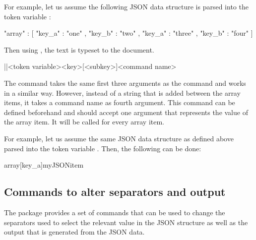 \documentclass[a4paper]{article}
\begin{document}
For example, let us assume the following JSON data structure is parsed into the token variable \macro{\myJSONdata}:

\begin{codeexample}
{
  "array" : [
    {
      "key_a" : "one" ,
      "key_b" : "two"
    } ,
    {
      "key_a" : "three" ,
      "key_b" : "four"
    }
  ]
}
\end{codeexample}

Then using , the text  is typeset to the document. 

\begin{macrodef}
|\JSONParseUseArrayValues|{<token variable>}{<key>}[<subkey>]{<command name>}
\end{macrodef}
The command \macro{\JSONParseUseArrayValues} takes the same first three arguments as the command \macro{\JSONParseGetArrayValues} and works in a similar way. However, instead of a string that is added between the array items, it takes a command name as fourth argument. This command can be defined beforehand and should accept one argument that represents the value of the array item. It will be called for every array item.

For example, let us assume the same JSON data structure as defined above parsed into the token variable \macro{\myJSONdata}. Then, the following can be done:


\begin{codeexamplecolumns}
\newcommand{\myJSONitem}[1]{
  \item \emph{#1}
}

\begin{itemize}
  \JSONParseUseArrayValues{\myJSONdata}
    {array}[key_a]{myJSONitem}
\end{itemize}
\end{codeexamplecolumns}

\subsection{Commands to alter separators and output}

The package provides a set of commands that can be used to change the separators used to select the relevant value in the JSON structure as well as the output that is generated from the JSON data.
\end{document}
